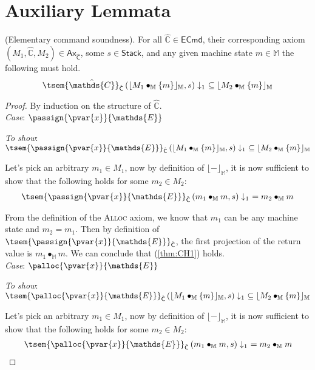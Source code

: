 \section{Auxiliary Lemmata}

\thm \label{thm:eSound} (Elementary command soundness). For all $\hat{\mathds{C}} \in \mathsf{ECmd}$, their corresponding axiom $(M_1, \hat{\mathds{C}}, M_2) \in \mathsf{Ax}_{\hat{\mathsf{C}}}$, some $s \in \mathsf{Stack}$, and any given machine state $m \in \mathbb{M}$ the following must hold.
\[
	\tsem{\hat{\mathds{C}}}_{\hat{\mathsf{C}}} \left( \lfloor M_1 \bullet_\mathbb{M} \{m\} \rfloor_\mathbb{M}, s \right) \downarrow_1\ \subseteq \lfloor M_2 \bullet_\mathbb{M} \{m\} \rfloor_\mathbb{M}
\]
{\parindent0pt
\begin{proof}
By induction on the structure of $\hat{\mathds{C}}$. \\

\textit{Case}: $\passign{\pvar{x}}{\mathds{E}}$

\textit{To show}: $\tsem{\passign{\pvar{x}}{\mathds{E}}}_{\hat{\mathsf{C}}} \left( \lfloor M_1 \bullet_\mathbb{M} \{m\} \rfloor_\mathbb{M}, s \right) \downarrow_1\ \subseteq \lfloor M_2 \bullet_\mathbb{M} \{m\} \rfloor_\mathbb{M}$

Let's pick an arbitrary $m_1 \in M_1$, now by definition of $\lfloor - \rfloor_\mathbb{M}$, it is now sufficient to show that the following holds for some $m_2 \in M_2$:
\begin{gather}
	\label{thm:CH1} \tsem{\passign{\pvar{x}}{\mathds{E}}}_{\hat{\mathsf{C}}} \left(m_1 \bullet_\mathbb{M} m, s \right) \downarrow_1\ = m_2 \bullet_\mathbb{M} m
\end{gather}

From the definition of the \textsc{Alloc} axiom, we know that $m_1$ can be any machine state and $m_2 = m_1$. Then by definition of $\tsem{\passign{\pvar{x}}{\mathds{E}}}_{\hat{\mathsf{C}}}$, the first projection of the return value is $m_1 \bullet_\mathbb{M} m$. We can conclude that (\ref{thm:CH1}) holds.  \\

\textit{Case}: $\palloc{\pvar{x}}{\mathds{E}}$

\textit{To show}: $\tsem{\palloc{\pvar{x}}{\mathds{E}}}_{\hat{\mathsf{C}}} \left( \lfloor M_1 \bullet_\mathbb{M} \{m\} \rfloor_\mathbb{M}, s \right) \downarrow_1\ \subseteq \lfloor M_2 \bullet_\mathbb{M} \{m\} \rfloor_\mathbb{M}$

Let's pick an arbitrary $m_1 \in M_1$, now by definition of $\lfloor - \rfloor_\mathbb{M}$, it is now sufficient to show that the following holds for some $m_2 \in M_2$:
\begin{gather}
	\label{thm:CH3} \tsem{\palloc{\pvar{x}}{\mathds{E}}}_{\hat{\mathsf{C}}} \left(m_1 \bullet_\mathbb{M} m, s \right) \downarrow_1\ = m_2 \bullet_\mathbb{M} m
\end{gather}


\end{proof}}

